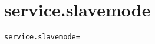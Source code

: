 \section{service.slavemode}
\label{configuration:ServiceSlavemode}
\AvailableInCsharpOnly{\TODO}
\begin{lstlisting}[style=Props,caption={Usage example for \textit{service.slavemode}}]
service.slavemode=
\end{lstlisting}